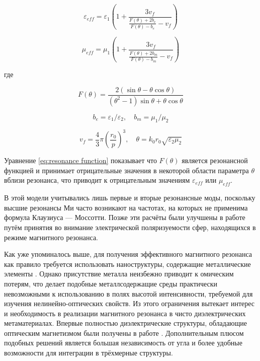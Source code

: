\begin{equation}
	\varepsilon_{eff} = \varepsilon_1 \left(1 + \frac{3 v_f}{ \frac{F(\theta) + 2b_e}{F(\theta) - b_e} - v_f } \right)
\end{equation}

\begin{equation}
	\mu_{eff} = \mu_1 \left(1 + \frac{3 v_f}{ \frac{F(\theta) + 2b_m}{F(\theta) - b_m} - v_f } \right)
\end{equation}

где

\begin{equation}
	F(\theta) = \frac{2 \left( \sin \theta - \theta \cos \theta\right)}{\left( \theta^2 - 1 \right) \sin \theta + \theta \cos \theta}
	\label{eq:resonance function}
\end{equation}

\begin{equation}
	b_e = \varepsilon_1 / \varepsilon_2, \quad b_m = \mu_1 / \mu_2
\end{equation}

\begin{equation}
	v_f = \frac{4}{3} \pi \left( \frac{r_0}{p} \right)^3, \quad \theta = k_0 r_0 \sqrt{\varepsilon_2 \mu_2}
\end{equation}

Уравнение \ref{eq:resonance function} показывает что $F(\theta)$ является резонансной функцией и принимает отрицательные значения в некоторой области параметра $\theta$ вблизи резонанса, что приводит к отрицательным значениям $\varepsilon_{eff}$ или $\mu_{eff}$.

В этой модели учитывались лишь первые и вторые резонансные моды, поскольку высшие резонансы Ми часто возникают на частотах, на которых не применима формула Клаузиуса — Моссотти. Позже эти расчёты были улучшены в работе \cite{Jylha2006} путём принятия во внимание электрической поляризуемости сфер, находящихся в режиме магнитного резонанса.

Как уже упоминалось выше, для получения эффективного магнитного резонанса как правило требуется использовать наноструктуры, содержащие металлические элементы \cite{Zhao2009}. Однако присутствие металла неизбежно приводит к омическим потерям, что делает подобные металлсодержащие среды практически невозможными к использованию в полях высотой интенсивности, требуемой для изучения нелинейно-оптических свойств. Из этого ограничения вытекает интерес и необходимость в реализации магнитного резонанса в чисто диэлектрических метаматериалах. Впервые полностью диэлектрические структуры, обладающие оптическим магнетизмом были получены в работе \cite{Ginn2012}. Дополнительным плюсом подобных решений является большая независимость от угла и более удобные возможности для интеграции в трёхмерные структуры.